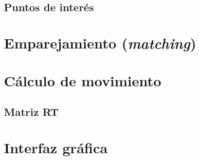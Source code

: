 \subsection{Puntos de interés}

\section{Emparejamiento (\textit{matching})}

\section{Cálculo de movimiento}

\subsection{Matriz RT}

\section{Interfaz gráfica}